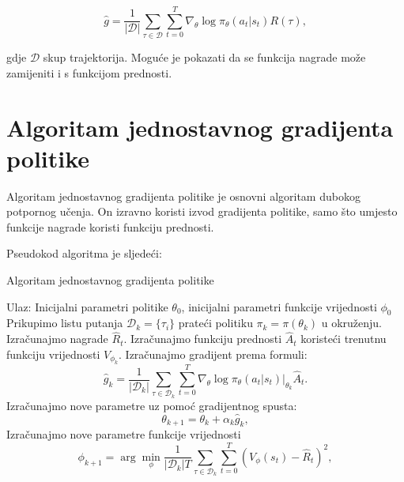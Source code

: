 \documentclass[times,utf8,diplomski]{fer}
\begin{document}
\begin{equation}
	\label{aritmeticka svih uzoraka}
	\hat{g} = \frac{1}{|\mathcal{D}|} \sum_{\tau \in \mathcal{D}} \sum_{t=0}^{T} \nabla_{\theta} \log \pi_{\theta}(a_t |s_t) R(\tau),
\end{equation}

\noindent gdje ${\mathcal{D}}$ skup trajektorija. Moguće je pokazati da se funkcija nagrade može zamijeniti i s funkcijom prednosti.


\section{Algoritam jednostavnog gradijenta politike}

Algoritam jednostavnog gradijenta politike je osnovni algoritam dubokog potpornog učenja. On izravno koristi izvod gradijenta politike, samo što umjesto funkcije nagrade koristi funkciju prednosti.

Pseudokod algoritma je sljedeći:

\begin{algorithm}[H]
	\caption{Algoritam jednostavnog gradijenta politike}
	\label{vpg}
	\begin{algorithmic}[1]
		\STATE Ulaz:  Inicijalni parametri politike $\theta_0$, inicijalni parametri funkcije vrijednosti $\phi_0$
		\STATE Prikupimo listu putanja ${\mathcal D}_k = \{\tau_i\}$ prateći politiku $\pi_k = \pi(\theta_k)$ u okruženju.
		\STATE Izračunajmo nagrade $\hat{R}_t$.
		\STATE Izračunajmo funkciju prednosti $\hat{A}_t$ koristeći trenutnu funkciju vrijednosti $V_{\phi_k}$.
		\STATE Izračunajmo gradijent prema formuli:
		\begin{equation*}
			\hat{g}_k = \frac{1}{|{\mathcal D}_k|} \sum_{\tau \in {\mathcal D}_k} \sum_{t=0}^T \left. \nabla_{\theta} \log\pi_{\theta}(a_t|s_t)\right|_{\theta_k} \hat{A}_t.
		\end{equation*}
		\STATE Izračunajmo nove parametre uz pomoć gradijentnog spusta:
		\begin{equation*}
			\theta_{k+1} = \theta_k + \alpha_k \hat{g}_k,
		\end{equation*}
		\STATE Izračunajmo nove parametre funkcije vrijednosti
		\begin{equation*}
			\phi_{k+1} = \arg \min_{\phi} \frac{1}{|{\mathcal D}_k| T} \sum_{\tau \in {\mathcal D}_k} \sum_{t=0}^T\left( V_{\phi} (s_t) - \hat{R}_t \right)^2,
		\end{equation*}
		\ENDFOR
	\end{algorithmic}
\end{algorithm}
\end{document}
